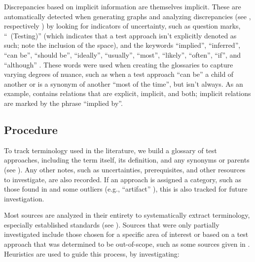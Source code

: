 Discrepancies based on implicit information are themselves implicit. These are
automatically detected when generating graphs and analyzing discrepancies
(see \ifnotpaper {}, respectively\else
    \fi) by looking for indicators
of uncertainty, such as question marks, ``~(Testing)'' (which indicates that a
test approach isn't explicitly denoted as such; note the inclusion of the
space), and the keywords ``implied'', ``inferred'', ``can be'', ``should be'',
``ideally'', ``usually'', ``most'', ``likely'', ``often'', ``if'', and ``although''
. These words were used when creating
the glossaries to capture varying degrees of nuance, such as when a test
approach ``can be'' a child of another or is a synonym of another ``most of the
time'', but isn't always. As an example,  contains relations
that are explicit, implicit, and both; implicit relations are marked by the
phrase ``implied by''.

\subsection{Procedure}

To track terminology used in the literature, we build a glossary of test
approaches, including the term itself, its definition, and
any synonyms or parents (see ). Any other notes, such as
uncertainties, prerequisites, and other resources to investigate, are also
recorded. If an approach is assigned a category, such as those found in
 and some outliers (e.g., ``artifact''%
), this is also tracked for future investigation.

Most sources are analyzed in their entirety to systematically extract
terminology, especially established standards (see ). Sources that
were only partially investigated include those chosen for a specific area of
interest or based on a test approach that was determined to be out-of-scope,
such as some sources given in .
Heuristics are used to guide this process, by investigating:

